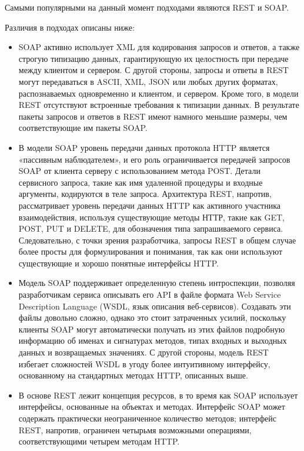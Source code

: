 Самыми популярными на данный момент подходами являются REST и SOAP.

Различия в подходах описаны ниже:

\begin{itemize}
	\item SOAP активно использует XML для кодирования запросов и ответов, а также строгую типизацию данных, гарантирующую их целостность при передаче между клиентом и сервером. С другой стороны, запросы и ответы в REST могут передаваться в ASCII, XML, JSON или любых других форматах, распознаваемых одновременно и клиентом, и сервером. Кроме того, в модели REST отсутствуют встроенные требования к типизации данных. В результате пакеты запросов и ответов в REST имеют намного меньшие размеры, чем соответствующие им пакеты SOAP.
	\item В модели SOAP уровень передачи данных протокола HTTP является «пассивным наблюдателем», и его роль ограничивается передачей запросов SOAP от клиента серверу с использованием метода POST. Детали сервисного запроса, такие как имя удаленной процедуры и входные аргументы, кодируются в теле запроса. Архитектура REST, напротив, рассматривает уровень передачи данных HTTP как активного участника взаимодействия, используя существующие методы НТТР, такие как GET, POST, PUT и DELETE, для обозначения типа запрашиваемого сервиса. Следовательно, с точки зрения разработчика, запросы REST в общем случае более просты для формулирования и понимания, так как они используют существующие и хорошо понятные интерфейсы HTTP.
	\item Модель SOAP поддерживает определенную степень интроспекции, позволяя разработчикам сервиса описывать его API в файле формата Web Service Description Language (WSDL, язык описания веб-сервисов). Создавать эти файлы довольно сложно, однако это стоит затраченных усилий, поскольку клиенты SOAP могут автоматически получать из этих файлов подробную информацию об именах и сигнатурах методов, типах входных и выходных данных и возвращаемых значениях. С другой стороны, модель REST избегает сложностей WSDL в угоду более интуитивному интерфейсу, основанному на стандартных методах HTTP, описанных выше.
	\item В основе REST лежит концепция ресурсов, в то время как SOAP использует интерфейсы, основанные на объектах и методах. Интерфейс SOAP может содержать практически неограниченное количество методов; интерфейс REST, напротив, ограничен четырьмя возможными операциями, соответствующими четырем методам HTTP.
\end{itemize}

